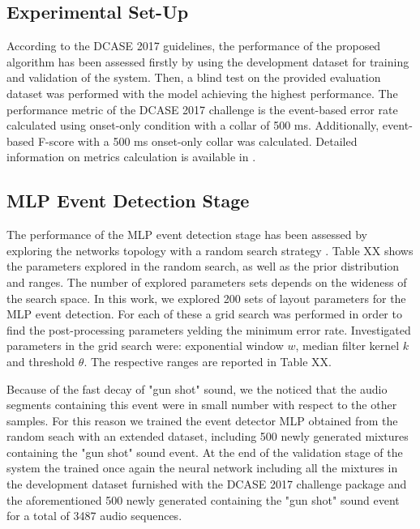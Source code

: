\documentclass{article}
\begin{document}
\begin{sloppy}
\section{Experimental Set-Up}
\label{sec:pagestyle}
According to the DCASE 2017 guidelines, the performance of the proposed algorithm has been assessed firstly by using the development dataset for training and validation of the system. Then, a blind test on the provided evaluation dataset was performed with the model achieving the highest performance. The performance metric of the DCASE 2017 challenge is the event-based error rate calculated using onset-only condition with a collar of 500 ms. Additionally, event-based F-score with a 500 ms onset-only collar was calculated. Detailed information on metrics calculation is available in \cite{Mesaros2016_MDPI}. 

\subsection{MLP Event Detection Stage}
The performance of the MLP event detection stage has been assessed by exploring the networks topology with a random search strategy \cite{bergstra2012random}. Table XX shows the parameters explored in the random search, as well as the prior distribution and ranges. The
number of explored parameters sets depends on the wideness of the search space. In this work, we explored 200 sets of layout parameters for the MLP event detection. For each of these a grid search was performed in order to find the post-processing parameters yelding the minimum error rate. Investigated parameters in the grid search were: exponential window $w$, median filter kernel $k$ and threshold $\theta$. The respective ranges are reported in Table XX.

Because of the fast decay of "gun shot" sound, we the noticed that the audio segments containing this event were in small number with respect to the other samples. For this reason we trained the event detector MLP obtained from the random seach with an extended dataset, including 500 newly generated mixtures containing the "gun shot" sound event.
At the end of the validation stage of the system the trained once again the neural network including all the mixtures in the development dataset furnished with the DCASE 2017 challenge package and the aforementioned 500 newly generated containing the "gun shot" sound event for a total of 3487 audio sequences.


\end{sloppy}
\end{document}
